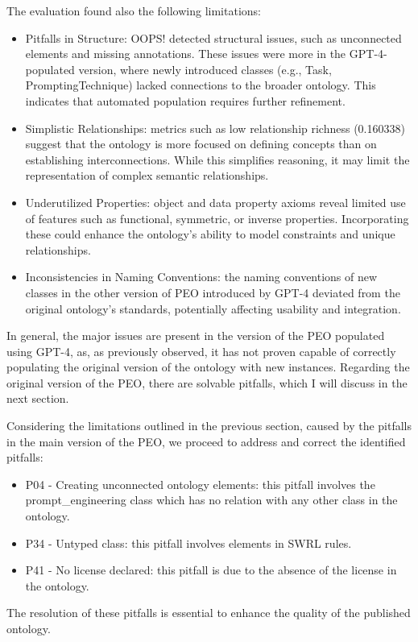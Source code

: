 The evaluation found also the following limitations:
\begin{itemize}
    \item Pitfalls in Structure: OOPS! detected structural
    issues, such as unconnected elements and missing annotations. These issues were more 
    in the GPT-4-populated version, where newly introduced classes (e.g., Task, PromptingTechnique) lacked connections to the broader ontology. This indicates that automated population requires further refinement.

    \item Simplistic Relationships: metrics such as low relationship richness (0.160338) suggest that the ontology is more focused on defining concepts than on establishing interconnections. While this simplifies reasoning, it may limit the representation of complex semantic relationships.

    \item Underutilized Properties: object and data property axioms reveal limited use of features such as functional, symmetric, or inverse properties. Incorporating these could enhance the ontology's ability to model constraints and unique relationships.

    \item Inconsistencies in Naming Conventions: the naming conventions of new classes in the other version of PEO introduced by GPT-4 deviated from the original ontology’s standards, potentially affecting usability and integration.
\end{itemize}
In general, the major issues are present in the version of the PEO populated using GPT-4, as, as previously observed, it has not proven capable of correctly populating the original version of the ontology with new instances. Regarding the original version of the PEO, there are solvable pitfalls, which I will discuss in the next section.


Considering the limitations outlined in the previous section, caused by the pitfalls in the main version of the PEO, we proceed to address and correct the identified pitfalls:
\begin{itemize}
    \item P04 - Creating unconnected ontology elements: this pitfall involves the prompt\_engineering class which has no relation with any other class in the ontology.

    \item P34 - Untyped class: this pitfall involves elements in SWRL rules.

    \item P41 - No license declared: this pitfall is due to the absence of the license in the ontology.
\end{itemize}
The resolution of these pitfalls is essential to enhance the quality of the published ontology.

